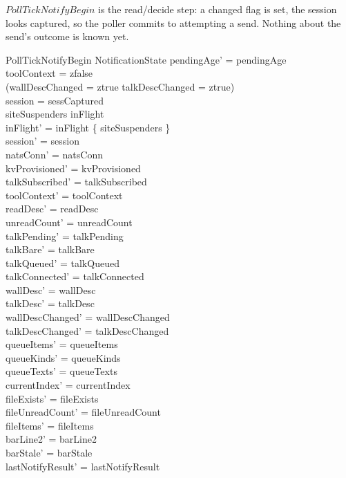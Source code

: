 \documentclass[a4paper,10pt,fleqn]{article}
\begin{document}
$PollTickNotifyBegin$ is the read/decide step: a changed flag is set,
the session looks captured, so the poller commits to attempting a
send.  Nothing about the send's outcome is known yet.

\begin{schema}{PollTickNotifyBegin}
  \Delta NotificationState
  \where
  pendingAge' = pendingAge \\
  toolContext = zfalse \\
  (wallDescChanged = ztrue \lor talkDescChanged = ztrue) \\
  session = sessCaptured \\
  siteSuspenders \notin inFlight \\
  inFlight' = inFlight \cup \{ siteSuspenders \} \\
  session' = session \\
  natsConn' = natsConn \\
  kvProvisioned' = kvProvisioned \\
  talkSubscribed' = talkSubscribed \\
  toolContext' = toolContext \\
  readDesc' = readDesc \\
  unreadCount' = unreadCount \\
  talkPending' = talkPending \\
  talkBare' = talkBare \\
  talkQueued' = talkQueued \\
  talkConnected' = talkConnected \\
  wallDesc' = wallDesc \\
  talkDesc' = talkDesc \\
  wallDescChanged' = wallDescChanged \\
  talkDescChanged' = talkDescChanged \\
  queueItems' = queueItems \\
  queueKinds' = queueKinds \\
  queueTexts' = queueTexts \\
  currentIndex' = currentIndex \\
  fileExists' = fileExists \\
  fileUnreadCount' = fileUnreadCount \\
  fileItems' = fileItems \\
  barLine2' = barLine2 \\
  barStale' = barStale \\
  lastNotifyResult' = lastNotifyResult \\

\end{schema}
\end{document}
